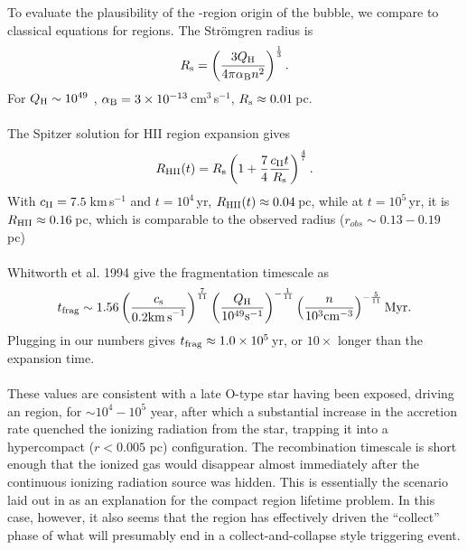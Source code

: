 \documentclass{aa}
\begin{document}
To evaluate the plausibility of the \hii-region origin of the bubble, we compare
to classical equations for \hii regions.
The Str\"omgren radius is \\
\begin{eqnarray}
R_{\rm s}=\left(\frac{3Q_{\rm H}}{4\pi\alpha_{\rm B} n^{2}}\right)^{\frac{1}{3}}.
\end{eqnarray} 
For $Q_{\rm H}\sim10^{49}$ \pers, $\alpha_{\rm B}=3\times10^{-13}$\,cm$^{3}$\,s$^{-1}$, $R_{\rm s}\approx0.01$\,pc.\\
\\
The Spitzer solution for HII region expansion gives\\
\begin{eqnarray}
R_{\rm HII}(t)=R_{\rm s}\left(1+\frac{7}{4}\frac{c_{\rm II}t}{R_{\rm s}}\right)^{\frac{4}{7}}.
\end{eqnarray} 
With $c_{\rm II}=7.5$\,km\,s$^{-1}$ and $t=10^{4}$\,yr,
$R_{\rm HII}(t)\approx0.04$\,pc, while at $t=10^5$\,yr, it is $R_{\rm
HII}\approx0.16$\,pc, which is comparable to the observed radius
($r_{obs} \sim 0.13-0.19$ pc)\\
\\
Whitworth et al. 1994 give the fragmentation timescale as
\begin{eqnarray}
t_{\rm frag}\sim1.56\left(\frac{c_{\rm s}}{0.2{\rm km\,s}^{-1}}\right)^{\frac{7}{11}}\left(\frac{Q_{\rm H}}{10^{49}{\rm s}^{-1}}\right)^{-\frac{1}{11}}\left(\frac{n}{10^{3}{\rm cm}^{-3}}\right)^{-\frac{5}{11}}{\rm Myr}.
\end{eqnarray} 
Plugging in our numbers gives $t_{\rm frag}\approx1.0\times10^{5}$\,yr, or
$10\times$ longer than the expansion time.\\
\\

These values are consistent with a late O-type star having been exposed,
driving an \hii region, for $\sim10^4-10^5$ year, after which a substantial
increase in the accretion rate quenched the ionizing radiation from the star,
trapping it into a hypercompact ($r<0.005$ pc) configuration.  The
recombination timescale is short enough that the ionized gas would disappear
almost immediately after the continuous ionizing radiation source was hidden.
This is essentially the scenario laid out in \citet{de-Pree2014a} as an
explanation for the compact \hii region lifetime problem.  In this case,
however, it also seems that the \hii region has effectively driven the
``collect'' phase of what will presumably end in a collect-and-collapse style
triggering event.
\end{document}
